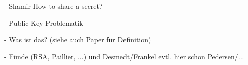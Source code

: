 \documentclass[
    fontsize=12pt,
    headings=small,
    parskip=half,           %
    bibliography=totoc,
    numbers=noenddot,       %
    open=any,               %
    ]{scrreprt}
\begin{document}
\label{sec_threshold}

- Shamir How to share a secret?

- Public Key Problematik

- Was ist das? (siehe auch Paper für Definition)

- Fünde (RSA, Paillier, ...) und Desmedt/Frankel evtl. hier schon Pedersen/...


\begin{raggedright}         %
  \printbibliography        %
  \label{sec:literaturverzeichnis}
\end{raggedright}
\end{document}
